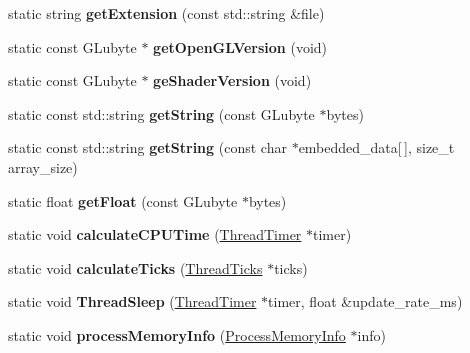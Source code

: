 \begin{DoxyCompactItemize}
\item 
\hypertarget{classEngine_1_1Utils_a797e1d42efab28f01205789601335ed5}{}static string {\bfseries get\+Extension} (const std\+::string \&file)\label{classEngine_1_1Utils_a797e1d42efab28f01205789601335ed5}

\item 
\hypertarget{classEngine_1_1Utils_ad23ed609d0072c6344946bc6430d9b27}{}static const G\+Lubyte $\ast$ {\bfseries get\+Open\+G\+L\+Version} (void)\label{classEngine_1_1Utils_ad23ed609d0072c6344946bc6430d9b27}

\item 
\hypertarget{classEngine_1_1Utils_a45543a7b5548a74369050c589474ee65}{}static const G\+Lubyte $\ast$ {\bfseries ge\+Shader\+Version} (void)\label{classEngine_1_1Utils_a45543a7b5548a74369050c589474ee65}

\item 
\hypertarget{classEngine_1_1Utils_a45e8c2c6df7798f35c077d1f8b09f73d}{}static const std\+::string {\bfseries get\+String} (const G\+Lubyte $\ast$bytes)\label{classEngine_1_1Utils_a45e8c2c6df7798f35c077d1f8b09f73d}

\item 
\hypertarget{classEngine_1_1Utils_a73ff1a529dd4a53a90c6891133e3ccca}{}static const std\+::string {\bfseries get\+String} (const char $\ast$embedded\+\_\+data\mbox{[}$\,$\mbox{]}, size\+\_\+t array\+\_\+size)\label{classEngine_1_1Utils_a73ff1a529dd4a53a90c6891133e3ccca}

\item 
\hypertarget{classEngine_1_1Utils_a0f6c5363907e8a02c4597fa2a6cdd11b}{}static float {\bfseries get\+Float} (const G\+Lubyte $\ast$bytes)\label{classEngine_1_1Utils_a0f6c5363907e8a02c4597fa2a6cdd11b}

\item 
\hypertarget{classEngine_1_1Utils_a17f87018f15b2c3c26317c31f8b99865}{}static void {\bfseries calculate\+C\+P\+U\+Time} (\hyperlink{structEngine_1_1ThreadTimer}{Thread\+Timer} $\ast$timer)\label{classEngine_1_1Utils_a17f87018f15b2c3c26317c31f8b99865}

\item 
\hypertarget{classEngine_1_1Utils_ad6b9c1ea75429b4c95ede880c0a5f88b}{}static void {\bfseries calculate\+Ticks} (\hyperlink{structEngine_1_1ThreadTicks}{Thread\+Ticks} $\ast$ticks)\label{classEngine_1_1Utils_ad6b9c1ea75429b4c95ede880c0a5f88b}

\item 
\hypertarget{classEngine_1_1Utils_a340db86eab3b8695257cf6ac1731d3a3}{}static void {\bfseries Thread\+Sleep} (\hyperlink{structEngine_1_1ThreadTimer}{Thread\+Timer} $\ast$timer, float \&update\+\_\+rate\+\_\+ms)\label{classEngine_1_1Utils_a340db86eab3b8695257cf6ac1731d3a3}

\item 
\hypertarget{classEngine_1_1Utils_aa4b9491452cfe116d1e85e01bfa966f0}{}static void {\bfseries process\+Memory\+Info} (\hyperlink{structEngine_1_1ProcessMemoryInfo}{Process\+Memory\+Info} $\ast$info)\label{classEngine_1_1Utils_aa4b9491452cfe116d1e85e01bfa966f0}

\end{DoxyCompactItemize}


